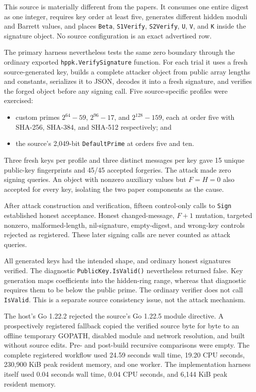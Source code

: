 \documentclass[10pt,a4paper]{article}
\begin{document}
This source is materially different from the papers. It consumes one entire
digest as one integer, requires key order at least five, generates different
hidden moduli and Barrett values, and places
\texttt{Beta}, \texttt{S1Verify}, \texttt{S2Verify}, \texttt{U},
\texttt{V}, and \texttt{K} inside the signature object. No source
configuration is an exact advertised row.

The primary harness nevertheless tests the same zero boundary through the
ordinary exported \texttt{hppk.VerifySignature} function. For each trial it
uses a fresh source-generated key, builds a complete attacker object from
public array lengths and constants, serializes it to JSON, decodes it into a
fresh signature, and verifies the forged object before any signing call. Five
source-specific profiles were exercised:
\begin{itemize}
  \item custom primes $2^{64}-59$, $2^{96}-17$, and $2^{128}-159$, each at
        order five with SHA-256, SHA-384, and SHA-512 respectively; and
  \item the source's 2,049-bit \texttt{DefaultPrime} at orders five and ten.
\end{itemize}

Three fresh keys per profile and three distinct messages per key gave 15
unique public-key fingerprints and 45/45 accepted forgeries. The attack made
zero signing queries. An object with nonzero auxiliary values but $F=H=0$
also accepted for every key, isolating the two paper components as the cause.

After attack construction and verification, fifteen control-only calls to
\texttt{Sign} established honest acceptance. Honest changed-message,
$F+1$ mutation, targeted nonzero, malformed-length, nil-signature,
empty-digest, and wrong-key controls rejected as registered. These later
signing calls are never counted as attack queries.

All generated keys had the intended shape, and ordinary honest signatures
verified. The diagnostic \texttt{PublicKey.IsValid()} nevertheless returned
false. Key generation maps
coefficients into the hidden-ring range, whereas that diagnostic requires
them to be below the public prime. The ordinary verifier does not call
\texttt{IsValid}. This is a separate source consistency issue, not the attack
mechanism.

The host's Go 1.22.2 rejected the source's Go 1.22.5 module directive. A
prospectively registered fallback copied the verified source byte for byte to
an offline temporary GOPATH, disabled module and network resolution, and built
without source edits. Pre- and post-build recursive comparisons were empty.
The complete registered workflow used 24.59 seconds wall time, 19.20 CPU
seconds, 230,900 KiB peak resident memory, and one worker. The implementation
harness itself used 0.04 seconds wall time, 0.04 CPU seconds, and 6,144 KiB
peak resident memory.
\end{document}
